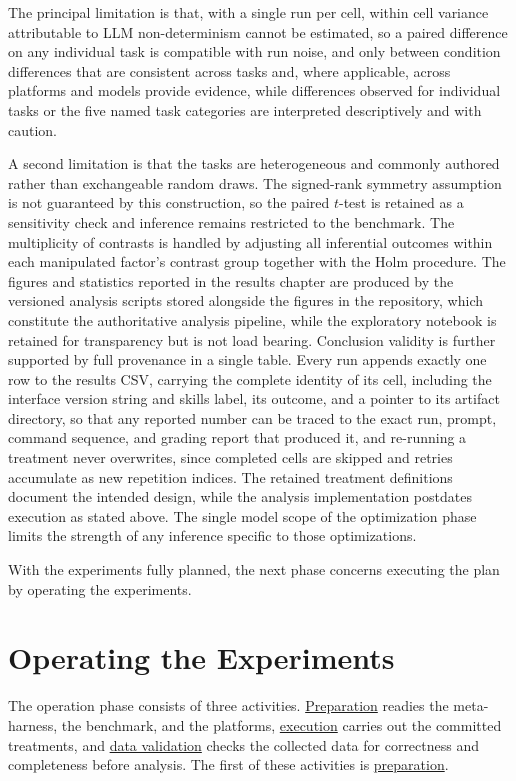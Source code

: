 \documentclass[
english,                 %
bibtex,                  %
]{kththesis}
\numberwithin{listing}{chapter}
\begin{document}
The principal limitation is that, with a single run per cell, within cell variance attributable to \gls{LLM} non-determinism cannot be estimated, so a paired difference on any individual task is compatible with run noise, and only between condition differences that are consistent across tasks and, where applicable, across platforms and models provide evidence, while differences observed for individual tasks or the five named task categories are interpreted descriptively and with caution.

A second limitation is that the tasks are heterogeneous and commonly authored rather than exchangeable random draws. The signed-rank symmetry assumption is not guaranteed by this construction, so the paired $t$-test is retained as a sensitivity check and inference remains restricted to the benchmark. The multiplicity of contrasts is handled by adjusting all inferential outcomes within each manipulated factor's contrast group together with the Holm procedure. The figures and statistics reported in the results chapter are produced by the versioned analysis scripts stored alongside the figures in the repository, which constitute the authoritative analysis pipeline, while the exploratory notebook is retained for transparency but is not load bearing. Conclusion validity is further supported by full provenance in a single table. Every run appends exactly one row to the results \gls{CSV}, carrying the complete identity of its cell, including the interface version string and skills label, its outcome, and a pointer to its artifact directory, so that any reported number can be traced to the exact run, prompt, command sequence, and grading report that produced it, and re-running a treatment never overwrites, since completed cells are skipped and retries accumulate as new repetition indices. The retained treatment definitions document the intended design, while the analysis implementation postdates execution as stated above. The single model scope of the optimization phase limits the strength of any inference specific to those optimizations.

With the experiments fully planned, the next phase concerns executing the plan by operating the experiments.

\section{Operating the Experiments}
\label{sec:method_operating_the_experiments}
\glsresetall

The operation phase consists of three activities. \hyperref[sec:method_preparation]{Preparation} readies the meta-harness, the benchmark, and the platforms, \hyperref[sec:method_execution]{execution} carries out the committed treatments, and \hyperref[sec:method_data_validation]{data validation} checks the collected data for correctness and completeness before analysis. The first of these activities is \hyperref[sec:method_preparation]{preparation}.
\end{document}
